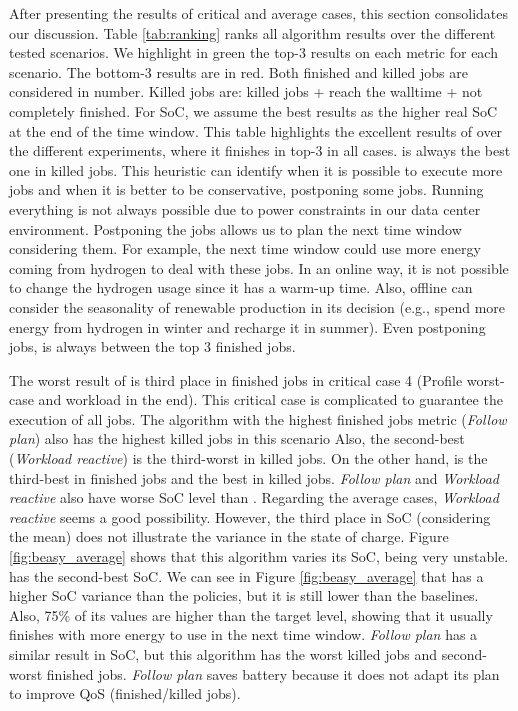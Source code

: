After presenting the results of critical and average cases, this section consolidates our discussion. Table \ref{tab:ranking} ranks all algorithm results over the different tested scenarios. We highlight in green the top-3 results on each metric for each scenario. The bottom-3 results are in red. Both finished and killed jobs are considered in number. Killed jobs are: killed jobs + reach the walltime + not completely finished. For SoC, we assume the best results as the higher real SoC at the end of the time window. This table highlights the excellent results of \emph{\systemName} over the different experiments, where it finishes in top-3 in all cases. \emph{\systemName} is always the best one in killed jobs. This heuristic can identify when it is possible to execute more jobs and when it is better to be conservative, postponing some jobs. Running everything is not always possible due to power constraints in our data center environment. Postponing the jobs allows us to plan the next time window considering them. For example, the next time window could use more energy coming from hydrogen to deal with these jobs. In an online way, it is not possible to change the hydrogen usage since it has a warm-up time. Also, offline can consider the seasonality of renewable production in its decision (e.g., spend more energy from hydrogen in winter and recharge it in summer). Even postponing jobs, \emph{\systemName} is always between the top 3 finished jobs. 

The worst result of \emph{\systemName} is third place in finished jobs in critical case 4 (Profile worst-case and workload in the end). This critical case is complicated to guarantee the execution of all jobs. The algorithm with the highest finished jobs metric (\emph{Follow plan}) also has the highest killed jobs in this scenario Also, the second-best (\emph{Workload reactive}) is the third-worst in killed jobs. On the other hand, \emph{\systemName} is the third-best in finished jobs and the best in killed jobs. \emph{Follow plan} and \emph{Workload reactive} also have worse SoC level than \emph{\systemName}. Regarding the average cases, \emph{Workload reactive} seems a good possibility. However, the third place in SoC (considering the mean) does not illustrate the variance in the state of charge. Figure \ref{fig:beasy_average} shows that this algorithm varies its SoC, being very unstable. \emph{\systemName} has the second-best SoC. We can see in Figure \ref{fig:beasy_average} that \emph{\systemName} has a higher SoC variance than the policies, but it is still lower than the baselines. Also, 75\% of its values are higher than the target level, showing that it usually finishes with more energy to use in the next time window. \emph{Follow plan} has a similar result in SoC, but this algorithm has the worst killed jobs and second-worst finished jobs. \emph{Follow plan} saves battery because it does not adapt its plan to improve QoS (finished/killed jobs). 

